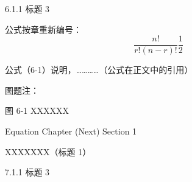 \documentclass[UTF8, scheme=chinese, openany, oneside]{ctexbook}
\begin{document}

\vspace{0.3cm}
\noindent \hspace{2em} { 6.1.1 \quad 标题 3}

\vspace{1.2cm}
\noindent \hspace{2em} 公式按章重新编号：
\vspace{0.6cm}
\begin{equation}
\frac{n!}{r!(n-r)!} \frac{1}{2} \tag{6-1} \label{eq:6-1}
\end{equation}

\vspace{1.8cm}
\noindent \hspace{2em} 公式（6-1）说明，…………（公式在正文中的引用）
\vspace{3.5cm}

\noindent \hspace{2em} 图题注：

\vspace{0.8cm}

\begin{center}
     图 6-1 \quad XXXXXX
\end{center}

\newpage
{}
\vspace*{5cm}
\begin{center}
{\color{white} Equation Chapter (Next) Section 1}
\end{center}


\clearpage
\setcounter{chapter}{6}
\setcounter{page}{16}


\vspace{1cm}
\begin{center}
{ \quad XXXXXXX（标题 1）}
\end{center}
\vspace{0.8cm}


\vspace{0.3cm}
\noindent \hspace{2em} { 7.1.1 \quad 标题 3}
\end{document}
